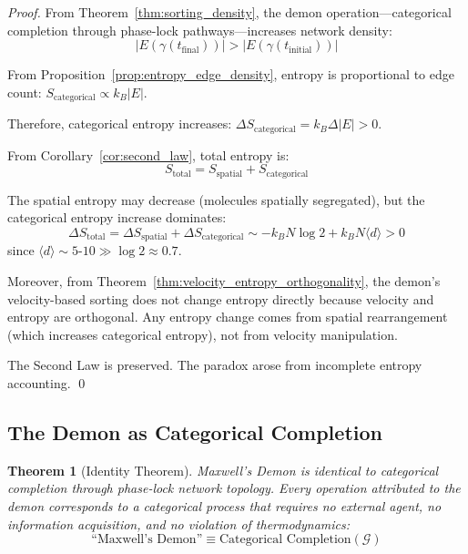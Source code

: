 \documentclass[12pt,a4paper]{article}
\newtheorem{theorem}{Theorem}[section]
\theoremstyle{definition}
\theoremstyle{remark}
\newcommand{\phaselockgraph}{\mathcal{G}}
\begin{document}
\begin{proof}
From Theorem~\ref{thm:sorting_density}, the demon operation—categorical completion through phase-lock pathways—increases network density:
\begin{equation}
|E(\gamma(t_{\text{final}}))| > |E(\gamma(t_{\text{initial}}))|
\end{equation}

From Proposition~\ref{prop:entropy_edge_density}, entropy is proportional to edge count: $S_{\text{categorical}} \propto k_B |E|$.

Therefore, categorical entropy increases: $\Delta S_{\text{categorical}} = k_B \Delta |E| > 0$.

From Corollary~\ref{cor:second_law}, total entropy is:
\begin{equation}
S_{\text{total}} = S_{\text{spatial}} + S_{\text{categorical}}
\end{equation}

The spatial entropy may decrease (molecules spatially segregated), but the categorical entropy increase dominates:
\begin{equation}
\Delta S_{\text{total}} = \Delta S_{\text{spatial}} + \Delta S_{\text{categorical}} \sim -k_B N \log 2 + k_B N \langle d \rangle > 0
\end{equation}
since $\langle d \rangle \sim 5$-$10 \gg \log 2 \approx 0.7$.

Moreover, from Theorem~\ref{thm:velocity_entropy_orthogonality}, the demon's velocity-based sorting does not change entropy directly because velocity and entropy are orthogonal. Any entropy change comes from spatial rearrangement (which increases categorical entropy), not from velocity manipulation.

The Second Law is preserved. The paradox arose from incomplete entropy accounting. \qed
\end{proof}

\subsection{The Demon as Categorical Completion}

\begin{theorem}[Identity Theorem]
\label{thm:identity}
Maxwell's Demon is identical to categorical completion through phase-lock network topology. Every operation attributed to the demon corresponds to a categorical process that requires no external agent, no information acquisition, and no violation of thermodynamics:
\begin{equation}
\boxed{\text{``Maxwell's Demon''} \equiv \text{Categorical Completion}(\phaselockgraph)}
\label{eq:demon_identity}
\end{equation}
\end{theorem}
\end{document}
